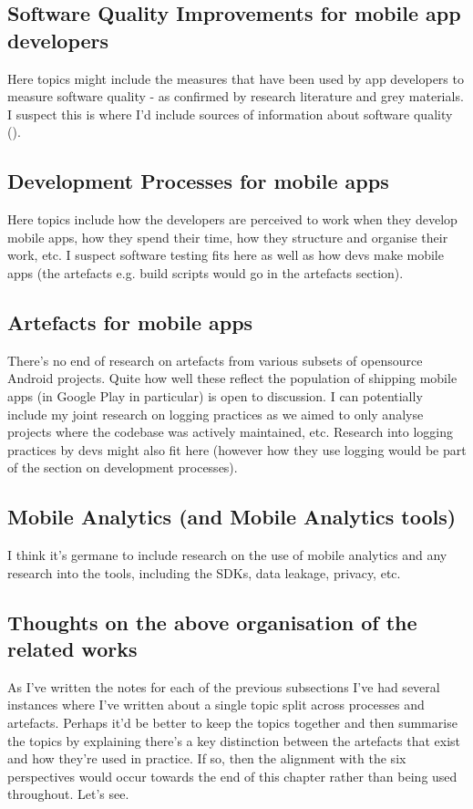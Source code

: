 \subsection*{Software Quality Improvements for mobile app developers}
Here topics might include the measures that have been used by app developers to measure software quality - as confirmed by research literature and grey materials. I suspect this is where I'd include sources of information about software quality ().

\subsection*{Development Processes for mobile apps}
Here topics include how the developers are perceived to work when they develop mobile apps, how they spend their time, how they structure and organise their work, etc. I suspect software testing fits here as well as how devs make mobile apps (the artefacts e.g. build scripts would go in the artefacts section).

\subsection*{Artefacts for mobile apps}
There's no end of research on artefacts from various subsets of opensource Android projects. Quite how well these reflect the population of shipping mobile apps (in Google Play in particular) is open to discussion. I can potentially include my joint research on logging practices as we aimed to only analyse projects where the codebase was actively maintained, etc. Research into logging practices by devs might also fit here (however how they use logging would be part of the section on development processes).

\subsection*{Mobile Analytics (and Mobile Analytics tools)}
I think it's germane to include research on the use of mobile analytics and any research into the tools, including the SDKs, data leakage, privacy, etc.

\subsection*{Thoughts on the above organisation of the related works}
As I've written the notes for each of the previous subsections I've had several instances where I've written about a single topic split across processes and artefacts. Perhaps it'd be better to keep the topics together and then summarise the topics by explaining there's a key distinction between the artefacts that exist and how they're used in practice. If so, then the alignment with the six perspectives would occur towards the end of this chapter rather than being used throughout. Let's see.

